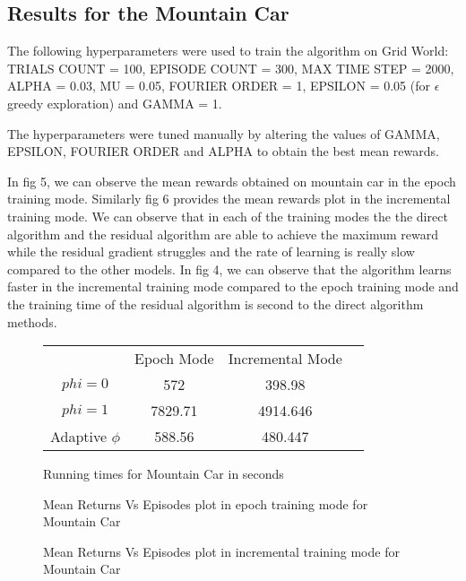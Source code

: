 \documentclass[fleqn]{article}
\begin{document}
\subsection*{Results for the Mountain Car}

The following hyperparameters were used to train the algorithm on Grid World:
TRIALS COUNT = 100, EPISODE COUNT = 300, MAX TIME STEP = 2000, ALPHA = 0.03, MU = 0.05, FOURIER ORDER = 1, EPSILON = 0.05 (for $\epsilon$ greedy exploration) and GAMMA = 1.

The hyperparameters were tuned manually by altering the values of GAMMA, EPSILON, FOURIER ORDER and ALPHA to obtain the best mean rewards.

In fig 5, we can observe the mean rewards obtained on mountain car in the epoch training mode. Similarly fig 6 provides the mean rewards plot in the incremental training mode. We can observe that in each of the training modes the the direct algorithm and the residual algorithm are able to achieve the maximum reward while the residual gradient struggles and the rate of learning is really slow compared to the other models. In fig 4, we can observe that the algorithm learns faster in the incremental training mode compared to the epoch training mode and the training time of the residual algorithm is second to the direct algorithm methods.
\begin{figure}%
\begin{center}
\begin{tabular}{ |c|c|c|c| } 
 \hline
           & Epoch Mode & Incremental Mode \\
 $phi = 0$ & 572 & 398.98 \\ 
 $phi = 1$ & 7829.71 & 4914.646 \\ 
 Adaptive $\phi$ & 588.56 & 480.447 \\ 
 \hline
\end{tabular}
\end{center}
\caption{Running times for Mountain Car in seconds}%
    \label{fig:example}%
\end{figure}

\begin{figure}%
    \centering
    \qquad
    \qquad
    \caption{Mean Returns Vs Episodes plot in epoch training mode for Mountain Car}%
    \label{fig:example}%
\end{figure}

\begin{figure}%
    \centering
    \qquad
    \qquad
    \caption{Mean Returns Vs Episodes plot in incremental training mode for Mountain Car}%
    \label{fig:example}%
\end{figure}
\end{document}
